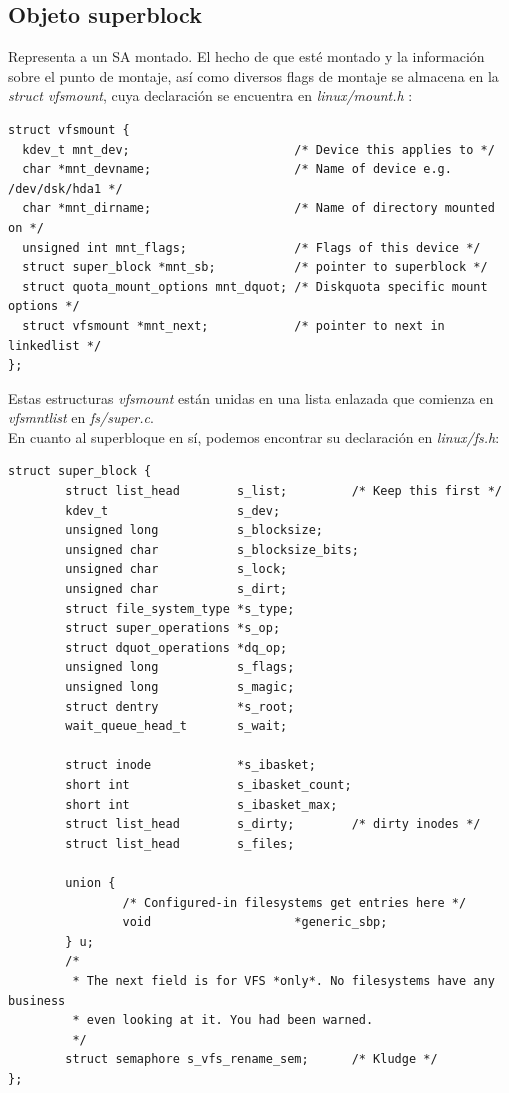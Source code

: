 \documentclass[11pt,a4paper]{article}
\newcommand\tab[1][1cm]{\hspace*{#1}}
\begin{document}
\subsection {Objeto superblock} 

\tab Representa a un SA montado. El hecho de que esté montado y la información sobre el punto de montaje, así como diversos flags de montaje se almacena en la \emph{struct vfsmount}, cuya declaración se encuentra en \emph{linux/mount.h} \cite{silberschatz}: 

\begin{verbatim}
struct vfsmount {
  kdev_t mnt_dev;                       /* Device this applies to */
  char *mnt_devname;                    /* Name of device e.g. /dev/dsk/hda1 */
  char *mnt_dirname;                    /* Name of directory mounted on */
  unsigned int mnt_flags;               /* Flags of this device */
  struct super_block *mnt_sb;           /* pointer to superblock */
  struct quota_mount_options mnt_dquot; /* Diskquota specific mount options */
  struct vfsmount *mnt_next;            /* pointer to next in linkedlist */
};
\end{verbatim}



\tab Estas estructuras \emph{vfsmount} están unidas en una lista enlazada que comienza en \emph{vfsmntlist} en \emph{fs/super.c}. \\

\tab En cuanto al superbloque en sí, podemos encontrar su declaración en \emph{linux/fs.h}: 

\begin{verbatim}
struct super_block {
        struct list_head        s_list;         /* Keep this first */
        kdev_t                  s_dev;
        unsigned long           s_blocksize;
        unsigned char           s_blocksize_bits;
        unsigned char           s_lock;
        unsigned char           s_dirt;
        struct file_system_type *s_type;
        struct super_operations *s_op;
        struct dquot_operations *dq_op;
        unsigned long           s_flags;
        unsigned long           s_magic;
        struct dentry           *s_root;
        wait_queue_head_t       s_wait;

        struct inode            *s_ibasket;
        short int               s_ibasket_count;
        short int               s_ibasket_max;
        struct list_head        s_dirty;        /* dirty inodes */
        struct list_head        s_files;

        union {
                /* Configured-in filesystems get entries here */
                void                    *generic_sbp;
        } u;
        /*
         * The next field is for VFS *only*. No filesystems have any business
         * even looking at it. You had been warned.
         */
        struct semaphore s_vfs_rename_sem;      /* Kludge */
};
\end{verbatim}
\end{document}

